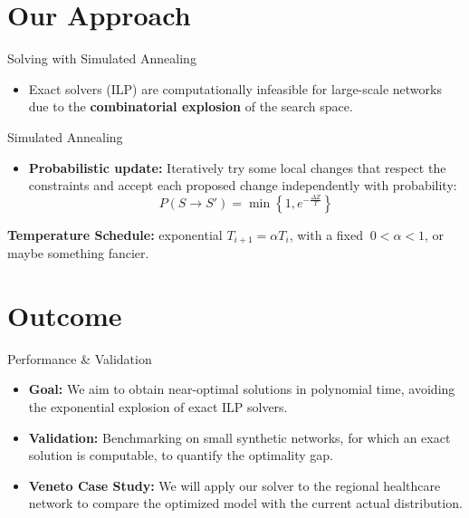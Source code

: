\documentclass[11pt]{beamer}
\begin{document}
\section{Our Approach}
\begin{frame}{Solving with Simulated Annealing}
  \begin{itemize}
    \item Exact solvers (ILP) are computationally infeasible for large-scale networks due to the \textbf{combinatorial explosion} of the search space.
    \end{itemize}
  \vfill

  \begin{block}{Simulated Annealing}
    \begin{itemize}
      \item \textbf{Probabilistic update:} Iteratively try some local changes that respect the constraints and accept each proposed change independently with probability:
      \[ P(S \to S') = \min\left\{ 1, e^{-\frac{\Delta Z}{T}} \right\} \]
    \end{itemize}
      \item \textbf{Temperature Schedule:} exponential $T_{i+1} = \alpha T_{i}$, with a fixed $\ 0<\alpha<1$, or maybe something fancier.
  \end{block}

  \vfill
\end{frame}


\section{Outcome}
\begin{frame}{Performance \& Validation}
  \begin{itemize}
    \item \textbf{Goal:} We aim to obtain near-optimal solutions in polynomial time, avoiding the exponential explosion of exact ILP solvers.
    \vspace{10pt}

    \item \textbf{Validation:} Benchmarking on small synthetic networks, for which an exact solution is computable, to quantify the optimality gap.

    \vfill

    \item \textbf{Veneto Case Study:} We will apply our solver to the regional healthcare network to compare the optimized model with the current actual distribution.
  \end{itemize}
\end{frame}
\end{document}
